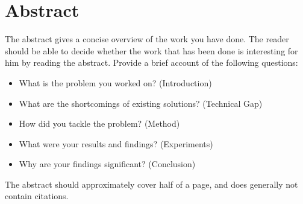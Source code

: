 %


\vspace{3cm}

\chapter*{Abstract}
\noindent The abstract gives a concise overview of the work you have done. The reader should be able to decide whether the work that has been done is interesting for him by reading the abstract. Provide a brief account of the following questions:

\begin{itemize}
 \item What is the problem you worked on? (Introduction)
 \item What are the shortcomings of existing solutions? (Technical Gap)
 \item How did you tackle the problem? (Method)
 \item What were your results and findings? (Experiments)
 \item Why are your findings significant? (Conclusion)
\end{itemize}

\noindent The abstract should approximately cover half of a page, and does generally not contain citations.


